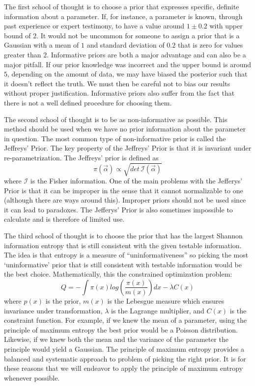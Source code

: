 \documentclass[12pt]{article}
\numberwithin{equation}{section}
\begin{document}
The first school of thought is to choose a prior that expresses specific, definite information about a parameter.
If, for instance, a parameter is known, through past experience or expert testimony, to have a value 
around $1 \pm 0.2$ with upper bound of $2$. It would not be uncommon for someone to assign a prior that is a Gaussian with a mean of 
$1$ and standard deviation of $0.2$ that is zero for values greater than $2$. Informative priors are both a major advantage and can 
also be a major pitfall. If our prior knowledge was incorrect and the upper bound is around $5$, depending on the amount of data, we 
may have biased the posterior such that it doesn't reflect the truth. We must then be careful not to bias our results without proper 
justification. Informative priors also suffer from the fact that there is not a well defined procedure for choosing them. 

The second school of thought is to be as non-informative as possible. This method should 
be used when we have no prior information about the parameter in question. The most common type of non-informative prior 
is called the Jeffreys' Prior. The key property of the Jeffreys' Prior is that it is invariant under re-parametrization. 
The Jeffreys' prior is defined as 
\begin{equation} \label{eq:jefferys}
	\pi(\vec{\alpha}) \propto \sqrt{det \,\mathcal{I}(\vec{\alpha})}
\end{equation}
where $\mathcal{I}$ is the Fisher information. One of the main problems with the Jefferys' Prior is that it can be 
improper in the sense that it cannot normalizable to one (although there are ways around this). Improper priors should 
not be used since it can lead to paradoxes.\cite{von2011bayesian}
The Jefferys' Prior is also sometimes impossible to calculate and is therefore of limited use.

The third school of thought is to choose the prior that has the largest Shannon information entropy that is still consistent with the 
given testable information. The idea is that entropy is a measure of ``uninformativeness'' so picking the most `uninformative' prior 
that is still consistent with testable information would be the best choice. Mathematically, this the constrained optimization 
problem:
\begin{equation} \label{eq:maxent}
	Q = -\int \pi(x) log(\frac{\pi(x)}{m(x)})dx - \lambda C(x) 
\end{equation}
where $p(x)$ is the prior, $m(x)$ is the Lebesgue measure which ensures invariance under transformation, $\lambda$ is the Lagrange 
multiplier, and $C(x)$ is the constraint function. For example, if we knew the mean of a parameter, using the 
principle of maximum entropy the best prior would be a Poisson distribution. Likewise, if we knew both the mean and the variance of 
the parameter the principle would yield a Gaussian. The principle of maximum entropy provides a balanced and systematic approach to 
problem of picking the right prior. It is for these reasons that we will endeavor to apply the principle of maximum entropy 
whenever possible.   
\end{document}
